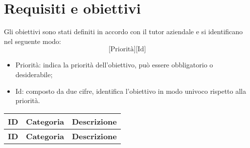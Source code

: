 \section{Requisiti e obiettivi}
Gli obiettivi sono stati definiti in accordo con il tutor aziendale e si
identificano nel seguente modo:
\[
    \text{[Priorità][Id]}
\]
\begin{itemize}
    \item Priorità: indica la priorità dell'obiettivo, può essere obbligatorio o
          desiderabile;
    \item Id: composto da due cifre, identifica l'obiettivo in modo univoco rispetto alla priorità.
\end{itemize}

\begin{longtable}{|c|p{4cm}|p{10cm}|}
    \hline
    \textbf{ID}  & \textbf{Categoria}                                               & \textbf{Descrizione}                                       \\
    \hline
    \endfirsthead

    \hline
    \textbf{ID}  & \textbf{Categoria}                                               & \textbf{Descrizione}                                       \\
    \hline
    \endhead


\end{longtable}
